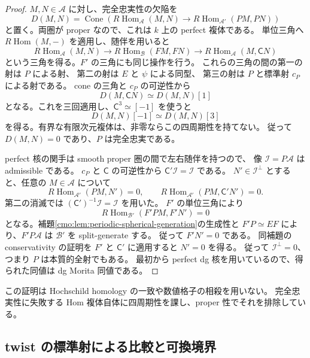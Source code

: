 \begin{proof}
$M,N\in\mathcal A$ に対し、完全忠実性の欠陥を
\[
 D(M,N)=\operatorname{Cone}\left(
 R\operatorname{Hom}_{\mathcal A}(M,N)
   \longrightarrow R\operatorname{Hom}_{\mathcal A'}(PM,PN)\right)
\]
と置く。両圏が proper なので、これは $k$ 上の perfect 複体である。
単位三角へ $R\operatorname{Hom}(M,-)$ を適用し、随伴を用いると
\[
 R\operatorname{Hom}_{\mathcal A}(M,N)
 \longrightarrow R\operatorname{Hom}_{\mathcal B}(FM,FN)
 \longrightarrow R\operatorname{Hom}_{\mathcal A}(M,\mathsf C N)
\]
という三角を得る。$F'$ の三角にも同じ操作を行う。
これらの三角の間の第一の射は $P$ による射、
第二の射は $E$ と $\psi$ による同型、
第三の射は $P$ と標準射 $c_P$ による射である。
cone の三角と $c_P$ の可逆性から
\begin{equation}
\label{cmo:eq:spherical-hom-defect-period}
 D(M,\mathsf C N)\simeq D(M,N)[1]
\end{equation}
となる。これを三回適用し、$\mathsf C^3\simeq[-1]$ を使うと
\[
 D(M,N)[-1]\simeq D(M,N)[3]
\]
を得る。有界な有限次元複体は、非零ならこの四周期性を持てない。
従って $D(M,N)=0$ であり、$P$ は完全忠実である。

perfect 核の関手は smooth proper 圏の間で左右随伴を持つので、
像 $\mathcal I=P\mathcal A$ は admissible である。
$c_P$ と $\mathsf C$ の可逆性から
$\mathsf C'\mathcal I=\mathcal I$ である。
$N'\in\mathcal I^\perp$ とすると、任意の $M\in\mathcal A$ について
\[
 R\operatorname{Hom}_{\mathcal A'}(PM,N')=0,
 \qquad
 R\operatorname{Hom}_{\mathcal A'}(PM,\mathsf C'N')=0.
\]
第二の消滅では $(\mathsf C')^{-1}\mathcal I=\mathcal I$ を用いた。
$F'$ の単位三角により
\[
 R\operatorname{Hom}_{\mathcal B'}(F'PM,F'N')=0
\]
となる。補題\ref{cmo:lem:periodic-spherical-generation}の生成性と
$F'P\simeq EF$ により、$F'P\mathcal A$ は $\mathcal B'$ を split-generate する。
従って $F'N'=0$ である。
同補題の conservativity の証明を $F'$ と $\mathsf C'$ に適用すると $N'=0$ を得る。
従って $\mathcal I^\perp=0$、つまり $P$ は本質的全射でもある。
最初から perfect dg 核を用いているので、得られた同値は dg Morita 同値である。
\end{proof}

この証明は Hochschild homology の一致や数値格子の相殺を用いない。
完全忠実性に失敗する Hom 複体自体に四周期性を課し、proper 性でそれを排除している。

\subsection{twist の標準射による比較と可換境界}

